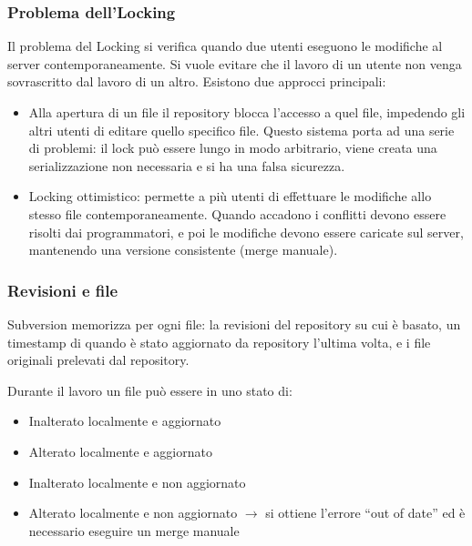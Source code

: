 \subsubsection{Problema dell'Locking}Il problema del Locking si verifica quando due utenti eseguono le modifiche al server contemporaneamente. Si vuole evitare che il lavoro di un utente non venga sovrascritto dal lavoro di un altro. Esistono due approcci principali:
\begin{itemize}

\item Alla apertura di un file il repository blocca l'accesso a quel file, impedendo gli altri utenti di editare quello specifico file. Questo sistema porta ad una serie di problemi: il lock pu\`o essere lungo in modo arbitrario, viene creata una serializzazione non necessaria e si ha una falsa sicurezza.
\item Locking ottimistico: permette a pi\`u utenti di effettuare le modifiche allo stesso file contemporaneamente. Quando accadono i conflitti devono essere risolti dai programmatori, e poi le modifiche devono essere caricate sul server, mantenendo una versione consistente (merge manuale).
  
\end{itemize}

\subsubsection{Revisioni e file}
Subversion memorizza per ogni file: la revisioni del repository su cui \`e basato, un timestamp di quando \`e stato aggiornato da repository l'ultima volta, e i file originali prelevati dal repository.

Durante il lavoro un file pu\`o essere in uno stato di:
\begin{itemize}

\item Inalterato localmente e aggiornato
\item Alterato localmente e aggiornato
\item Inalterato localmente e non aggiornato
\item Alterato localmente e non aggiornato $\to$ si ottiene l'errore ``out of date'' ed \`e necessario eseguire un merge manuale
  
\end{itemize}

